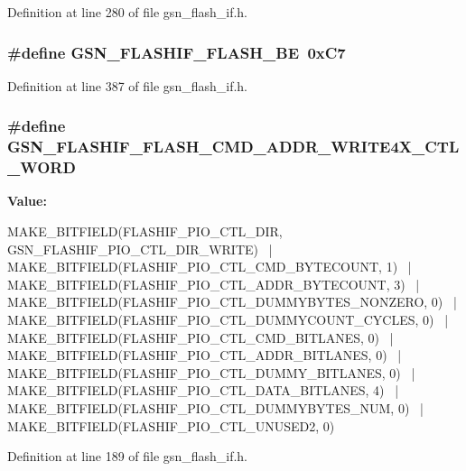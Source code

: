 Definition at line 280 of file gsn\_\-flash\_\-if.h.

\hypertarget{a00501_ab7fd0cfaf7e0dc856a389a06650cab92}{
\subsubsection[{GSN\_\-FLASHIF\_\-FLASH\_\-BE}]{\setlength{\rightskip}{0pt plus 5cm}\#define GSN\_\-FLASHIF\_\-FLASH\_\-BE~0xC7}}
\label{a00501_ab7fd0cfaf7e0dc856a389a06650cab92}


Definition at line 387 of file gsn\_\-flash\_\-if.h.

\hypertarget{a00501_af38bcd1228c1bb46d9d949bb2c207027}{
\subsubsection[{GSN\_\-FLASHIF\_\-FLASH\_\-CMD\_\-ADDR\_\-WRITE4X\_\-CTL\_\-WORD}]{\setlength{\rightskip}{0pt plus 5cm}\#define GSN\_\-FLASHIF\_\-FLASH\_\-CMD\_\-ADDR\_\-WRITE4X\_\-CTL\_\-WORD}}
\label{a00501_af38bcd1228c1bb46d9d949bb2c207027}
{\bfseries Value:}
\begin{DoxyCode}
MAKE_BITFIELD(FLASHIF_PIO_CTL_DIR, GSN_FLASHIF_PIO_CTL_DIR_WRITE) \
        | MAKE_BITFIELD(FLASHIF_PIO_CTL_CMD_BYTECOUNT, 1) \
        | MAKE_BITFIELD(FLASHIF_PIO_CTL_ADDR_BYTECOUNT, 3) \
        | MAKE_BITFIELD(FLASHIF_PIO_CTL_DUMMYBYTES_NONZERO, 0) \
        | MAKE_BITFIELD(FLASHIF_PIO_CTL_DUMMYCOUNT_CYCLES, 0) \
        | MAKE_BITFIELD(FLASHIF_PIO_CTL_CMD_BITLANES, 0) \
        | MAKE_BITFIELD(FLASHIF_PIO_CTL_ADDR_BITLANES, 0) \
        | MAKE_BITFIELD(FLASHIF_PIO_CTL_DUMMY_BITLANES, 0) \
        | MAKE_BITFIELD(FLASHIF_PIO_CTL_DATA_BITLANES, 4) \
        | MAKE_BITFIELD(FLASHIF_PIO_CTL_DUMMYBYTES_NUM, 0) \
        | MAKE_BITFIELD(FLASHIF_PIO_CTL_UNUSED2, 0)
\end{DoxyCode}


Definition at line 189 of file gsn\_\-flash\_\-if.h.

